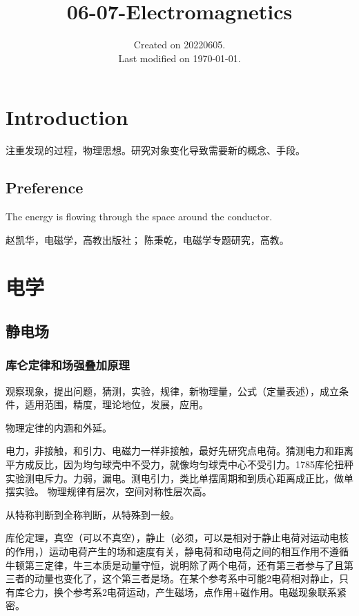 \documentclass[UTF8]{../06-Physics}
\begin{document}
\title{06-07-Electromagnetics}
\date{Created on 20220605.\\   Last modified on \today.}
\maketitle
\tableofcontents




\chapter{Introduction}

注重发现的过程，物理思想。研究对象变化导致需要新的概念、手段。

\section{Preference}

The energy is flowing through the space around the conductor.

赵凯华，电磁学，高教出版社；
陈秉乾，电磁学专题研究，高教。

\chapter{电学}

\section{静电场}

\subsection{库仑定律和场强叠加原理}

观察现象，提出问题，猜测，实验，规律，新物理量，公式（定量表述），成立条件，适用范围，精度，理论地位，发展，应用。 

物理定律的内涵和外延。

电力，非接触，和引力、电磁力一样非接触，最好先研究点电荷。猜测电力和距离平方成反比，因为均匀球壳中不受力，就像均匀球壳中心不受引力。1785库伦扭秤实验测电斥力。力弱，漏电。测电引力，类比单摆周期和到质心距离成正比，做单摆实验。
物理规律有层次，空间对称性层次高。

从特称判断到全称判断，从特殊到一般。

库伦定理，真空（可以不真空），静止（必须，可以是相对于静止电荷对运动电核的作用，）运动电荷产生的场和速度有关，静电荷和动电荷之间的相互作用不遵循牛顿第三定律，牛三本质是动量守恒，说明除了两个电荷，还有第三者参与了且第三者的动量也变化了，这个第三者是场。在某个参考系中可能2电荷相对静止，只有库仑力，换个参考系2电荷运动，产生磁场，点作用+磁作用。电磁现象联系紧密。
\end{document}
